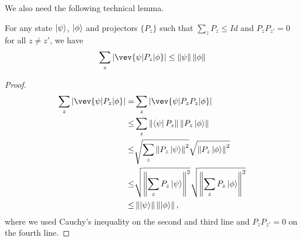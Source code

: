 We also need the following technical lemma.
\begin{lemma}\label{lem:samp-tech}
For any state $\ket{\psi}$,  $\ket{\phi}$ and projectors $\{P_z\}$ such that $\sum_z P_z \leq Id$ and $P_z P_{z'} =0 $ for all $z\neq z'$, we have
$$  \sum_z |\vev{\psi|P_z|\phi}| \leq \norm{\psi}\norm{\phi} $$
\end{lemma}
\begin{proof}
\begin{align}
    \sum_z |\vev{\psi|P_z|\phi}| =&\sum_z|\vev{\psi|P_zP_z|\phi}| \nn \\
    \leq& \sum_z \norm{\bra{\psi}P_z} \norm{ P_z\ket{\phi}}  \nn \\ \leq&  \sqrt{\sum_z \norm{P_z\ket{\psi}}^2} \sqrt{\norm{ P_z\ket{\phi}}^2}     \nn \\
    \leq& \sqrt{\norm{\sum_z P_z\ket{\psi}}^2 } \sqrt{\norm{\sum_z P_z\ket{\phi}}^2 } \nn \\
    \leq & \norm{\ket{\psi}}\norm{\ket{\phi}},
\end{align}
where we used Cauchy's inequality on the second and third line and $P_z P_{z'} =0 $ on the fourth line.
\end{proof}

